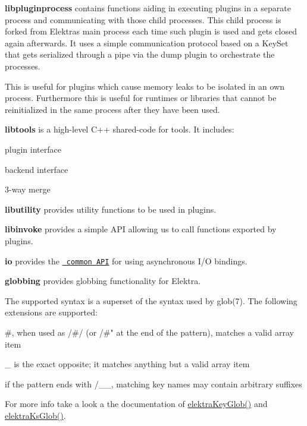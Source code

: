 {\bfseries{libpluginprocess}} contains functions aiding in executing plugins in a separate process and communicating with those child processes. This child process is forked from Elektra\textquotesingle{}s main process each time such plugin is used and gets closed again afterwards. It uses a simple communication protocol based on a Key\+Set that gets serialized through a pipe via the dump plugin to orchestrate the processes.

This is useful for plugins which cause memory leaks to be isolated in an own process. Furthermore this is useful for runtimes or libraries that cannot be reinitialized in the same process after they have been used.

{\bfseries{libtools}} is a high-\/level C++ shared-\/code for tools. It includes\+:


\begin{DoxyItemize}
\item plugin interface
\item backend interface
\item 3-\/way merge
\end{DoxyItemize}

{\bfseries{libutility}} provides utility functions to be used in plugins.


\begin{DoxyCode}{0}
\end{DoxyCode}


{\bfseries{libinvoke}} provides a simple A\+PI allowing us to call functions exported by plugins.


\begin{DoxyCode}{0}
\end{DoxyCode}


{\bfseries{io}} provides the \href{https://doc.libelektra.org/api/current/html/group__kdbio.html}{\texttt{ common A\+PI}} for using asynchronous I/O bindings.


\begin{DoxyCode}{0}
\end{DoxyCode}


{\bfseries{globbing}} provides globbing functionality for Elektra.

The supported syntax is a superset of the syntax used by {\ttfamily glob(7)}. The following extensions are supported\+:


\begin{DoxyItemize}
\item {\ttfamily \#}, when used as {\ttfamily /\#/} (or {\ttfamily /\#"} at the end of the pattern), matches a valid array item
\item {\ttfamily \+\_\+} is the exact opposite; it matches anything but a valid array item
\item if the pattern ends with {\ttfamily /\+\_\+\+\_\+}, matching key names may contain arbitrary suffixes
\end{DoxyItemize}

For more info take a look a the documentation of {\ttfamily \mbox{\hyperlink{globbing_8c_ad7700821df72fc0fc3bfc336e4368d29}{elektra\+Key\+Glob()}}} and {\ttfamily \mbox{\hyperlink{globbing_8c_a85baa9c79325ad1bf08e95cd82a4daf6}{elektra\+Ks\+Glob()}}}. 